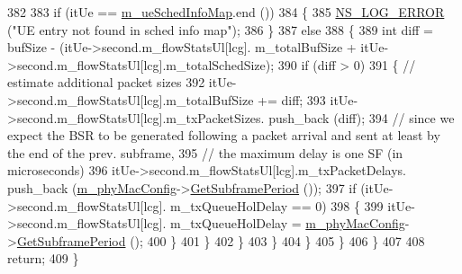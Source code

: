 \begin{DoxyCode}
382 
383                                         \textcolor{keywordflow}{if} (itUe == \hyperlink{classns3_1_1MmWaveFlexTtiPfMacScheduler_a3b6dd19d8156d24c8d30cc562843b740}{m\_ueSchedInfoMap}.end ())
384                                         \{
385                                                 \hyperlink{group__logging_ga0261a8db1d4ac5f79417d117634fd455}{NS\_LOG\_ERROR} (\textcolor{stringliteral}{"UE entry not found in sched info
       map"});
386                                         \}
387                                         \textcolor{keywordflow}{else}
388                                         \{
389                                                 \textcolor{keywordtype}{int} diff = bufSize - (itUe->second.m\_flowStatsUl[lcg].
      m\_totalBufSize + itUe->second.m\_flowStatsUl[lcg].m\_totalSchedSize);
390                                                 \textcolor{keywordflow}{if} (diff > 0)
391                                                 \{       \textcolor{comment}{// estimate additional packet sizes}
392                                                         itUe->second.m\_flowStatsUl[lcg].m\_totalBufSize += 
      diff;
393                                                         itUe->second.m\_flowStatsUl[lcg].m\_txPacketSizes.
      push\_back (diff);
394                                                         \textcolor{comment}{// since we expect the BSR to be generated
       following a packet arrival and sent at least by the end of the prev. subframe,}
395                                                         \textcolor{comment}{// the maximum delay is one SF (in microseconds)}
396                                                         itUe->second.m\_flowStatsUl[lcg].m\_txPacketDelays.
      push\_back (\hyperlink{classns3_1_1MmWaveMacScheduler_a24d7af4971d2e500fe543cefbafa2fd9}{m\_phyMacConfig}->\hyperlink{classns3_1_1MmWavePhyMacCommon_a1d402260d29c8931dd3dde73b295e23d}{GetSubframePeriod} ());
397                                                         \textcolor{keywordflow}{if} (itUe->second.m\_flowStatsUl[lcg].
      m\_txQueueHolDelay == 0)
398                                                         \{
399                                                                 itUe->second.m\_flowStatsUl[lcg].
      m\_txQueueHolDelay = \hyperlink{classns3_1_1MmWaveMacScheduler_a24d7af4971d2e500fe543cefbafa2fd9}{m\_phyMacConfig}->\hyperlink{classns3_1_1MmWavePhyMacCommon_a1d402260d29c8931dd3dde73b295e23d}{GetSubframePeriod} ();
400                                                         \}
401                                                 \}
402                                         \}
403                                 \}
404                         \}
405                 \}
406         \}
407 
408         \textcolor{keywordflow}{return};
409 \}
\end{DoxyCode}


